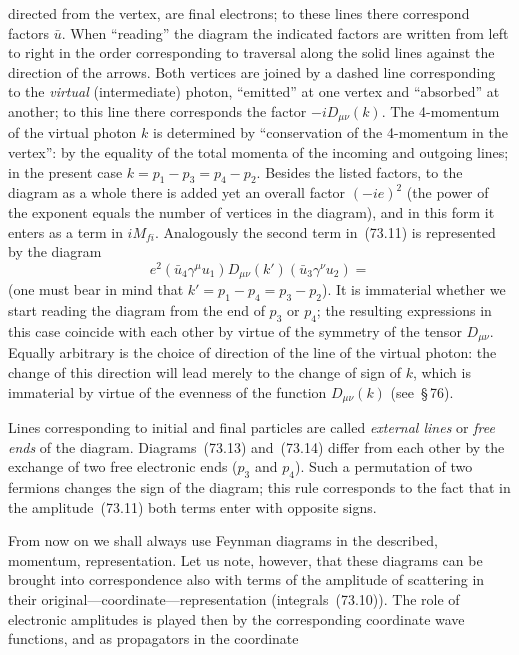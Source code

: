 directed from the vertex, are final electrons; to these lines there correspond factors $\bar{u}$. When ``reading'' the diagram the indicated factors are written from left to right in the order corresponding to traversal along the solid lines against the direction of the arrows. Both vertices are joined by a dashed line corresponding to the \textit{virtual} (intermediate) photon, ``emitted'' at one vertex and ``absorbed'' at another; to this line there corresponds the factor $-iD_{\mu\nu}(k)$. The 4-momentum of the virtual photon $k$ is determined by ``conservation of the 4-momentum in the vertex'': by the equality of the total momenta of the incoming and outgoing lines; in the present case $k = p_1 - p_3 = p_4 - p_2$. Besides the listed factors, to the diagram as a whole there is added yet an overall factor $(-ie)^2$ (the power of the exponent equals the number of vertices in the diagram), and in this form it enters as a term in $iM_{fi}$. Analogously the second term in~(73.11) is represented by the diagram
\begin{equation}
e^2(\bar{u}_4\gamma^\mu u_1)D_{\mu\nu}(k')(\bar{u}_3\gamma^\nu u_2) =
\tag{73.14}
\end{equation}
(one must bear in mind that $k' = p_1 - p_4 = p_3 - p_2$). It is immaterial whether we start reading the diagram from the end of $p_3$ or $p_4$; the resulting expressions in this case coincide with each other by virtue of the symmetry of the tensor $D_{\mu\nu}$. Equally arbitrary is the choice of direction of the line of the virtual photon: the change of this direction will lead merely to the change of sign of $k$, which is immaterial by virtue of the evenness of the function $D_{\mu\nu}(k)$ (see~\S\,76).

Lines corresponding to initial and final particles are called \textit{external lines} or \textit{free ends} of the diagram. Diagrams~(73.13) and~(73.14) differ from each other by the exchange of two free electronic ends ($p_3$ and $p_4$). Such a permutation of two fermions changes the sign of the diagram; this rule corresponds to the fact that in the amplitude~(73.11) both terms enter with opposite signs.

From now on we shall always use Feynman diagrams in the described, momentum, representation. Let us note, however, that these diagrams can be brought into correspondence also with terms of the amplitude of scattering in their original---coordinate---representation (integrals~(73.10)). The role of electronic amplitudes is played then by the corresponding coordinate wave functions, and as propagators in the coordinate

